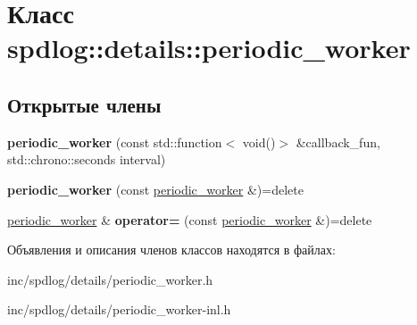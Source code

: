 \hypertarget{classspdlog_1_1details_1_1periodic__worker}{}\section{Класс spdlog\+:\+:details\+:\+:periodic\+\_\+worker}
\label{classspdlog_1_1details_1_1periodic__worker}
\subsection*{Открытые члены}
\begin{DoxyCompactItemize}
\item 
\mbox{\label{classspdlog_1_1details_1_1periodic__worker_a1f072b21c3be5b67cfc9c4ebcf9fb32d}} 
{\bfseries periodic\+\_\+worker} (const std\+::function$<$ void()$>$ \&callback\+\_\+fun, std\+::chrono\+::seconds interval)
\item 
\mbox{\label{classspdlog_1_1details_1_1periodic__worker_a43b4294bd9a547727864ff18da48b775}} 
{\bfseries periodic\+\_\+worker} (const \hyperlink{classspdlog_1_1details_1_1periodic__worker}{periodic\+\_\+worker} \&)=delete
\item 
\mbox{\label{classspdlog_1_1details_1_1periodic__worker_a81c0461ef77f85295b93991749df746b}} 
\hyperlink{classspdlog_1_1details_1_1periodic__worker}{periodic\+\_\+worker} \& {\bfseries operator=} (const \hyperlink{classspdlog_1_1details_1_1periodic__worker}{periodic\+\_\+worker} \&)=delete
\end{DoxyCompactItemize}


Объявления и описания членов классов находятся в файлах\+:\begin{DoxyCompactItemize}
\item 
inc/spdlog/details/periodic\+\_\+worker.\+h\item 
inc/spdlog/details/periodic\+\_\+worker-\/inl.\+h\end{DoxyCompactItemize}
